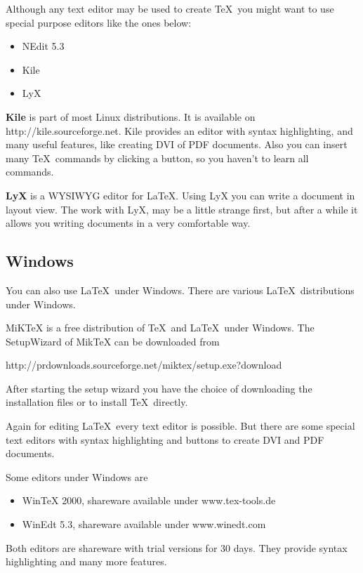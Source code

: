 Although any text editor may be used to create \TeX\
you might want to use special purpose editors like the ones below:

\begin{itemize}
\item NEdit 5.3
\item Kile
\item LyX
\end{itemize}

\textbf{Kile} is part of most Linux distributions. It is available on http://kile.sourceforge.net.
Kile provides an editor with syntax highlighting, and many useful features, like creating DVI of PDF documents. Also you can insert many \TeX\ commands by clicking a button, so you haven't to learn all commands.

\textbf{LyX} is a WYSIWYG editor for \LaTeX.
Using LyX you can write a document in layout view. The work with LyX, may be a little strange first, but after a while it allows you writing documents in a very comfortable way.


\subsection{Windows}

You can also use \LaTeX\ under Windows.
There are various \LaTeX\ distributions under Windows.

MiKTeX is a free distribution of \TeX\ and \LaTeX\ under Windows.
The SetupWizard of MikTeX can be downloaded from

http://prdownloads.sourceforge.net/miktex/setup.exe?download

After starting the setup wizard you have the choice of downloading the installation files
or to install \TeX\ directly.

\medskip

Again for editing \LaTeX\ every text editor is possible.
But there are some special text editors with syntax
highlighting and buttons to create DVI and PDF documents.

Some editors under Windows are

\begin{itemize}
\item WinTeX 2000, shareware available under www.tex-tools.de
\item WinEdt 5.3, shareware available under www.winedt.com
\end{itemize}

Both editors are shareware with trial versions for 30 days.
They provide syntax highlighting and many more features.

